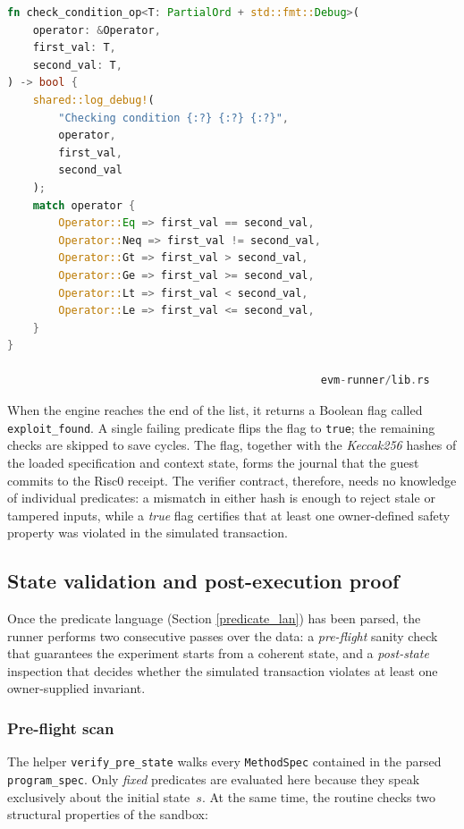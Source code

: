 \begin{lstlisting}[caption={[Generic comparator used by all predicates]},label={lst:checkop},language=Rust]
fn check_condition_op<T: PartialOrd + std::fmt::Debug>(
    operator: &Operator,
    first_val: T,
    second_val: T,
) -> bool {
    shared::log_debug!(
        "Checking condition {:?} {:?} {:?}",
        operator,
        first_val,
        second_val
    );
    match operator {
        Operator::Eq => first_val == second_val,
        Operator::Neq => first_val != second_val,
        Operator::Gt => first_val > second_val,
        Operator::Ge => first_val >= second_val,
        Operator::Lt => first_val < second_val,
        Operator::Le => first_val <= second_val,
    }
}                      

                                                 evm-runner/lib.rs
\end{lstlisting}

When the engine reaches the end of the list, it returns a Boolean flag called
\texttt{exploit\_found}.  A single failing predicate flips the flag to
\texttt{true}; the remaining checks are skipped to save cycles.  The flag,
together with the \textit{Keccak256} hashes of the loaded specification and context state, forms the journal that the guest commits to the Risc0 receipt. The verifier contract, therefore, needs no knowledge of individual predicates: a mismatch in either hash is enough to reject stale or tampered inputs, while a \textit{true} flag certifies that at least one owner-defined safety property was violated in the simulated transaction.

\subsection{State validation and post-execution proof}

Once the predicate language (Section \ref{predicate_lan}) has been parsed, the runner performs two consecutive passes over the data: a \textit{pre-flight} sanity check that guarantees the experiment starts from a coherent state, and a \textit{post-state} inspection that decides whether the simulated transaction violates at least one owner-supplied invariant.

\subsubsection{Pre-flight scan}

The helper \texttt{verify\_pre\_state} walks every \texttt{MethodSpec} contained in the parsed \texttt{program\_spec}. Only \textit{fixed} predicates are evaluated here because they speak exclusively about the initial state~\(s\).  
At the same time, the routine checks two structural properties of the sandbox:

